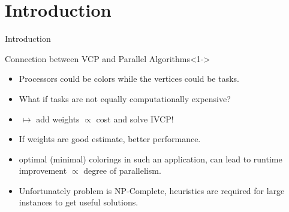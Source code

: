 \section{Introduction}

\begin{frame}{Introduction}
    \begin{overlayarea}{\textwidth}{\textheight}
        \begin{block}{Connection between VCP and Parallel Algorithms}<1->
            \begin{itemize}
                \item<2-> Processors could be colors while the vertices could be tasks. \\
                \item<3-> What if tasks are not equally computationally expensive? \\
                \item<4-> $\, \mapsto $ add weights $\propto$ cost and solve IVCP! \\
                \item<5-> If weights are good estimate, better performance.
                \item<6-> optimal (minimal) colorings in such an application, can lead to runtime improvement
                $\propto$ degree of parallelism. \\
                \item<7-> Unfortunately problem is NP-Complete, heuristics are required for large instances
                to get useful solutions.
            \end{itemize}
        \end{block}
    \end{overlayarea}
\end{frame}